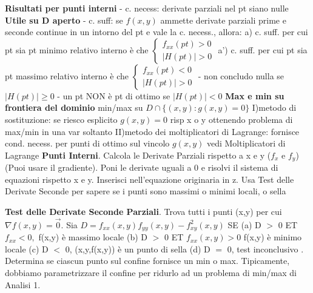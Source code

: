 \documentclass[10pt,landscape]{article}
\begin{document}
\begin{multicols*}{5}
\textbf{Risultati per punti interni}\newline
- c. necess: derivate parziali nel pt siano nulle \newline
\textbf{Utile su D aperto}\newline
- c. suff: se $f(x,y)$ ammette derivate parziali prime e seconde continue in un intorno del pt e vale la c. necess., allora: \newline
a) c. suff. per cui pt sia pt minimo relativo interno \`e che
$\left\{\begin{matrix}
f_{xx}(pt)>0\\ 
|H(pt)|>0
\end{matrix}\right.$
\newline
a') c. suff. per cui pt sia pt massimo relativo interno \`e che 
$\left\{\begin{matrix}
f_{xx}(pt)<0\\ 
|H(pt)|>0
\end{matrix}\right.$
- non concludo nulla se $|H(pt)|\geq0$
\newline
- un pt NON \`e pt di ottimo se  $|H(pt)|<0$ \newline
\newline
\textbf{Max e min su frontiera del dominio} \newline
min/max su $D \cap \{(x,y): g(x,y)=0\}$ \newline
I)metodo di sostituzione: se riesco esplicito $g(x,y)=0$ risp x o y ottenendo problema di max/min in una var soltanto
\newline
II)metodo dei moltiplicatori di Lagrange: fornisce cond. necess. per punti di ottimo sul vincolo $g(x,y)$ vedi Moltiplicatori di Lagrange
\newline
\newline
\textbf{Punti Interni}. Calcola le Derivate Parziali rispetto a x e y ($ f_x $ e $ f_y $) (Puoi usare il gradiente). Poni le derivate uguali a 0 e risolvi il sistema di equazioni rispetto x e y. Inserisci nell'equazione originaria in z.\newline
Usa Test delle Derivate Seconde per sapere se i punti sono massimi o minimi locali, o sella\newline

\textbf{Test delle Derivate Seconde Parziali}. Trova tutti i punti (x,y) per cui $ \nabla f(x,y) = \vec{0} $. Sia $ D=f_{xx}(x,y)f_{yy}(x,y)-f_{xy}^2(x,y) $\newline
SE (a) D $>$ 0 ET $ f_{xx} < 0, $ f(x,y) \`e massimo locale \newline
(b) D $>$ 0 ET $f_{xx}(x,y) > 0$ f(x,y) \`e minimo locale \newline
(c) D $<$ 0, (x,y,f(x,y)) \`e un punto di sella \newline
(d) D $=$ 0, test  inconclusivo . Determina se ciascun punto sul confine fornisce un min o max. Tipicamente, dobbiamo parametrizzare il confine per  ridurlo ad un problema di min/max di Analisi 1.


\end{multicols*}
\end{document}
